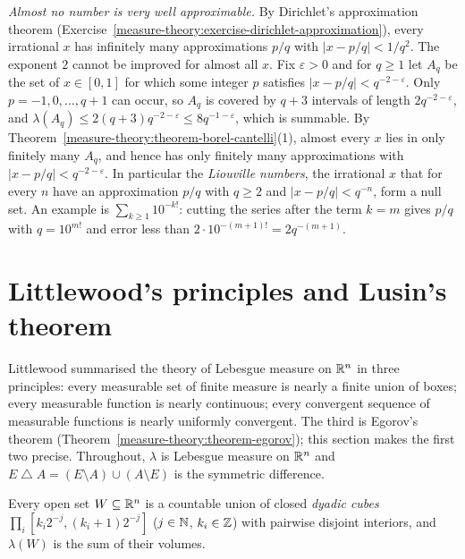 \begin{example}\label{measure-theory:example-diophantine}
\emph{Almost no number is very well approximable.} By Dirichlet's approximation theorem (Exercise~\ref{measure-theory:exercise-dirichlet-approximation}), every irrational $x$ has infinitely many
approximations $p/q$ with $|x - p/q| < 1/q^2$. The exponent $2$ cannot be improved for almost all $x$. Fix $\varepsilon > 0$ and for $q \geq 1$ let $A_q$ be the set of $x \in [0, 1]$ for which some integer
$p$ satisfies $|x - p/q| < q^{-2-\varepsilon}$. Only $p = -1, 0, \ldots, q + 1$ can occur, so $A_q$ is covered by $q + 3$ intervals of length $2q^{-2-\varepsilon}$, and
$\lambda(A_q) \leq 2(q + 3)q^{-2-\varepsilon} \leq 8q^{-1-\varepsilon}$, which is summable. By Theorem~\ref{measure-theory:theorem-borel-cantelli}(1), almost every $x$ lies in only finitely many $A_q$, and
hence has only finitely many approximations with $|x - p/q| < q^{-2-\varepsilon}$. In particular the \emph{Liouville numbers}, the irrational $x$ that for every $n$ have an approximation $p/q$ with $q \geq 2$ and
$|x - p/q| < q^{-n}$, form a null set. An example is $\sum_{k \geq 1}10^{-k!}$: cutting the series after the term $k = m$ gives $p/q$ with $q = 10^{m!}$ and error less than
$2 \cdot 10^{-(m+1)!} = 2q^{-(m+1)}$.
\end{example}

\section{Littlewood's principles and Lusin's theorem}\label{measure-theory:section-lusin}

Littlewood summarised the theory of Lebesgue measure on $\mathbb{R}^n$ in three principles: every measurable set of finite measure is nearly a finite union of boxes;
every measurable function is nearly continuous; every convergent sequence of measurable functions is nearly uniformly convergent. The third is Egorov's
theorem (Theorem~\ref{measure-theory:theorem-egorov}); this section makes the first two precise. Throughout, $\lambda$ is Lebesgue measure on $\mathbb{R}^n$ and
$E \mathbin{\triangle} A = (E \setminus A) \cup (A \setminus E)$ is the symmetric difference.

\begin{lemma}\label{measure-theory:lemma-dyadic-cubes}
Every open set $W \subseteq \mathbb{R}^n$ is a countable union of closed \emph{dyadic cubes} $\prod_i[k_i2^{-j}, (k_i + 1)2^{-j}]$ ($j \in \mathbb{N}$, $k_i \in \mathbb{Z}$) with pairwise
disjoint interiors, and $\lambda(W)$ is the sum of their volumes.
\end{lemma}

